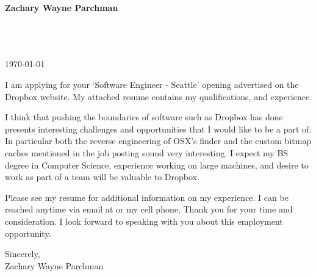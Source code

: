 \documentclass[10pt]{article}
\begin{document}

\begin{center}
\begin{Huge}
    \bf{Zachary Wayne Parchman}
\end{Huge}
\end{center}
\vspace{10mm}

\setlength{\parskip}{5mm}

\noindent
\address{}\\
\phone{}\\
\email{}\\

\noindent
\today{}


I am applying for your `Software Engineer - Seattle' opening
advertised on the Dropbox website. 
My attached resume contains my qualifications, and experience.

I think that pushing the boundaries of software such as Dropbox has done
presents interesting challenges and opportunities that I would like to be a
part of. In particular both the reverse engineering of OSX's finder and the
custom bitmap caches mentioned in the job posting sound very interesting.  I
expect my BS degree in Computer Science, experience working on large machines,
and desire to work as part of a team will be valuable to Dropbox.

Please see my resume for additional information on my experience.  I can be
reached anytime via email at \email{} or my cell phone,
\phone{} Thank you for your time and consideration. I look forward to
speaking with you about this employment opportunity.

\noindent
Sincerely,\\
\hspace*{5mm}Zachary Wayne Parchman
\end{document}
